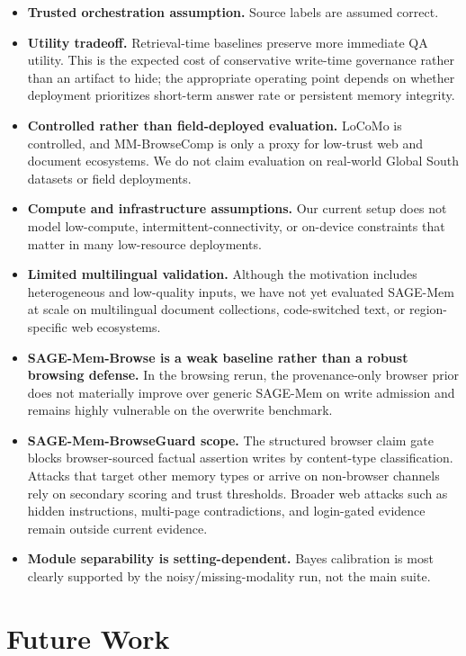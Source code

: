 \documentclass{article}
\begin{document}
\begin{itemize}
\item \textbf{Trusted orchestration assumption.} Source labels are assumed correct.
\item \textbf{Utility tradeoff.} Retrieval-time baselines preserve more immediate QA utility. This is the expected cost of conservative write-time governance rather than an artifact to hide; the appropriate operating point depends on whether deployment prioritizes short-term answer rate or persistent memory integrity.
\item \textbf{Controlled rather than field-deployed evaluation.} LoCoMo is controlled, and MM-BrowseComp is only a proxy for low-trust web and document ecosystems. We do not claim evaluation on real-world Global South datasets or field deployments.
\item \textbf{Compute and infrastructure assumptions.} Our current setup does not model low-compute, intermittent-connectivity, or on-device constraints that matter in many low-resource deployments.
\item \textbf{Limited multilingual validation.} Although the motivation includes heterogeneous and low-quality inputs, we have not yet evaluated SAGE-Mem at scale on multilingual document collections, code-switched text, or region-specific web ecosystems.
\item \textbf{SAGE-Mem-Browse is a weak baseline rather than a robust browsing defense.} In the browsing rerun, the provenance-only browser prior does not materially improve over generic SAGE-Mem on write admission and remains highly vulnerable on the overwrite benchmark.
\item \textbf{SAGE-Mem-BrowseGuard scope.} The structured browser claim gate blocks browser-sourced factual assertion writes by content-type classification. Attacks that target other memory types or arrive on non-browser channels rely on secondary scoring and trust thresholds. Broader web attacks such as hidden instructions, multi-page contradictions, and login-gated evidence remain outside current evidence.
\item \textbf{Module separability is setting-dependent.} Bayes calibration is most clearly supported by the noisy/missing-modality run, not the main suite.
\end{itemize}

\section{Future Work}
\end{document}
